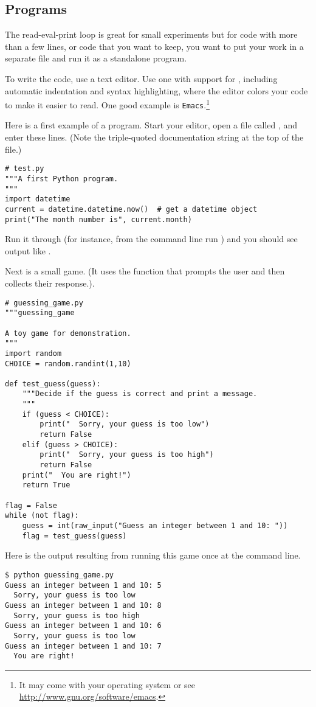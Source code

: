 \subsection{Programs}
The read-eval-print loop is great for small experiments but
for code with more than a few lines, or code that you want to
keep, you 
want to put your work in a separate file and run it as a standalone program.

To write the code, use a text editor.
Use one with support for \python{}, including
automatic indentation and  
syntax highlighting, where the editor colors your code to make it easier to
read.
One good example is \texttt{Emacs}.\footnote{%
  It may come with your operating system or 
  see \protect\url{http://www.gnu.org/software/emacs}.}


Here is a first example of a \python{} program.
Start your editor, open a file called , and enter these lines.
(Note the triple-quoted documentation string at the top of the file.)
\begin{lstlisting}[style=python]
# test.py
"""A first Python program. 
"""
import datetime
current = datetime.datetime.now()  # get a datetime object
print("The month number is", current.month)
\end{lstlisting}
Run it through \python{} (for instance, from the command line
run ) and you should see
output like .

Next is a small game. 
(It uses the \python{} function  that prompts the user
and then collects their response.).
\begin{lstlisting}[style=python]
# guessing_game.py
"""guessing_game

A toy game for demonstration.
"""
import random
CHOICE = random.randint(1,10)

def test_guess(guess):
    """Decide if the guess is correct and print a message.
    """
    if (guess < CHOICE):
        print("  Sorry, your guess is too low")
        return False
    elif (guess > CHOICE):
        print("  Sorry, your guess is too high")
        return False
    print("  You are right!")
    return True

flag = False
while (not flag):
    guess = int(raw_input("Guess an integer between 1 and 10: "))
    flag = test_guess(guess)
\end{lstlisting}
Here is the output resulting from running this game once at the command line.
\begin{lstlisting}
$ python guessing_game.py
Guess an integer between 1 and 10: 5
  Sorry, your guess is too low
Guess an integer between 1 and 10: 8
  Sorry, your guess is too high
Guess an integer between 1 and 10: 6
  Sorry, your guess is too low
Guess an integer between 1 and 10: 7
  You are right!
\end{lstlisting}  %

